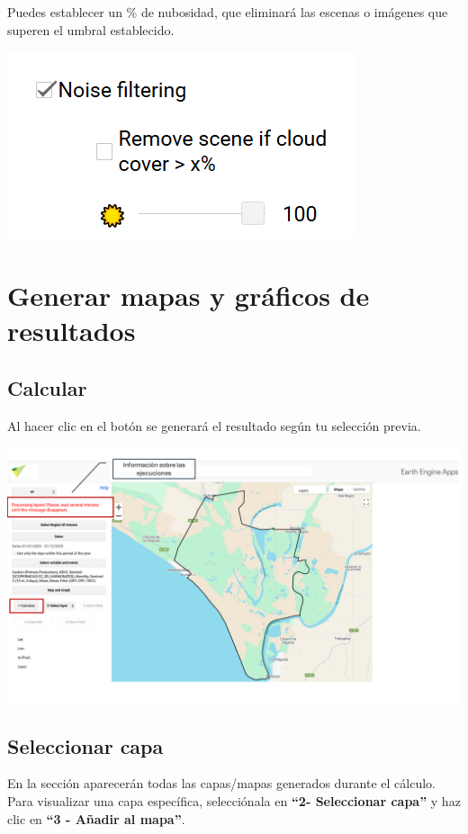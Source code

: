 \documentclass[
]{book}
\begin{document}
Puedes establecer un \% de nubosidad, que eliminará las escenas o imágenes que superen el umbral establecido.

\includegraphics{assets/filter.png}

\chapter{Generar mapas y gráficos de resultados}\label{mapas-graficos}

\section{\texorpdfstring{\textbf{Calcular}}{Calcular}}\label{calcular}

Al hacer clic en el botón se generará el resultado según tu selección previa.

\includegraphics{assets/message_es.png}

\section{\texorpdfstring{\textbf{Seleccionar capa}}{Seleccionar capa}}\label{seleccionar-capa}

En la sección aparecerán todas las capas/mapas generados durante el cálculo. Para visualizar una capa específica, selecciónala en \textbf{``2- Seleccionar capa''} y haz clic en \textbf{``3 - Añadir al mapa''}.
\end{document}
